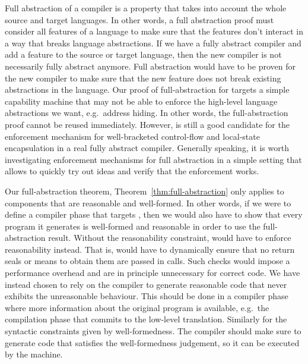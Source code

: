 \begin{jversion}
  Full abstraction of a compiler is a property that takes into account the whole source and target languages.
  In other words, a full abstraction proof must consider all features of a language to make sure that the features don't interact in a way that breaks language abstractions.
  If we have a fully abstract compiler and add a feature to the source or target language, then the new compiler is not necessarily fully abstract anymore.
  Full abstraction would have to be proven for the new compiler to make sure that the new feature does not break existing abstractions in the language.
  Our proof of full-abstraction for \stktokens{} targets a simple capability machine that may not be able to enforce the high-level language abstractions we want, e.g.\ address hiding.
  In other words, the full-abstraction proof cannot be reused immediately.
  However, \stktokens{} is still a good candidate for the enforcement mechanism for well-bracketed control-flow and local-state encapsulation in a real fully abstract compiler.
  Generally speaking, it is worth investigating enforcement mechanisms for full abstraction in a simple setting that allows to quickly try out ideas and verify that the enforcement works.

  Our full-abstraction theorem, Theorem~\ref{thm:full-abstraction} only applies to components that are reasonable and well-formed.
  In other words, if we were to define a compiler phase that targets \srccm{}, then we would also have to show that every program it generates is well-formed and reasonable in order to use the full-abstraction result.
  Without the reasonability constraint, \stktokens{} would have to enforce reasonability instead.
  That is, \stktokens{} would have to dynamically ensure that no return seals or means to obtain them are passed in calls.
  Such checks would impose a performance overhead and are in principle unnecessary for correct code.
  We have instead chosen to rely on the compiler to generate reasonable code that never exhibits the unreasonable behaviour.
  This should be done in a compiler phase where more information about the original program is available, e.g.\ the compilation phase that commits to the low-level translation.
  Similarly for the syntactic constraints given by well-formedness.
  The compiler should make sure to generate code that satisfies the well-formedness judgement, so it can be executed by the machine.


\end{jversion}
